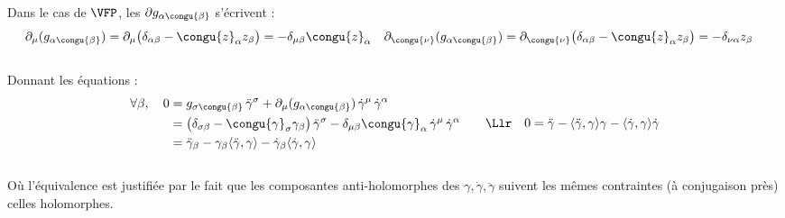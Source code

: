 \\
Dans le cas de $\VFP$, les $\partial g_{\alpha \congu{\beta}}$ s'écrivent :
\begin{align*}
	\partial_{\mu} (g_{\alpha \congu{\beta}}) &= \partial_{\mu} \big( \delta_{\alpha \beta} - \congu{z}_\alpha z_\beta \big) = - \delta_{\mu\beta} \congu{z}_\alpha   &  
	\partial_{\congu{\nu}} (g_{\alpha \congu{\beta}}) &= \partial_{\congu{\nu}} \big( \delta_{\alpha \beta} - \congu{z}_\alpha z_\beta \big) = - \delta_{\nu \alpha} z_\beta
\end{align*}
\\
Donnant les équations :
\begin{align*}
	\begin{aligned}
		\forall \beta,\quad 0 &= g_{\sigma \congu{\beta}}\, \ddot{\gamma}^\sigma + \partial_{\mu} (g_{\alpha \congu{\beta}}) \, \dot{\gamma}^\mu\, \dot{\gamma}^\alpha \\
		&= \big( \delta_{\sigma \beta} - \congu{\gamma}_\sigma \gamma_\beta \big)\, \ddot{\gamma}^\sigma - \delta_{\mu\beta} \congu{\gamma}_\alpha \, \dot{\gamma}^\mu\, \dot{\gamma}^\alpha \\
		&= \ddot{\gamma}_\beta - \gamma_\beta \langle \ddot{\gamma},\gamma\rangle - \dot{\gamma}_\beta \langle  \dot{\gamma}, \gamma \rangle 
	\end{aligned} \qquad \Llr\quad 
	0 = \ddot{\gamma} -  \langle \ddot{\gamma},\gamma\rangle \gamma -  \langle  \dot{\gamma}, \gamma \rangle \dot{\gamma}
\end{align*}
\\
Où l'équivalence est justifiée par le fait que les composantes anti-holomorphes des $\gamma, \dot{\gamma}, \ddot{\gamma}$ suivent les mêmes contraintes (à conjugaison près) celles holomorphes.

